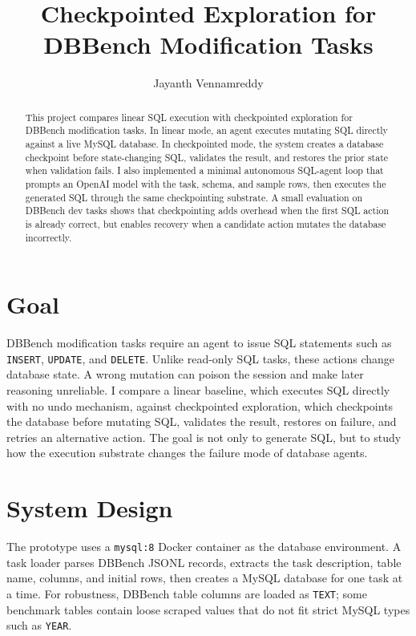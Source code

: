\documentclass[10pt,twocolumn]{article}
\title{Checkpointed Exploration for DBBench Modification Tasks}
\author{Jayanth Vennamreddy}
\date{}
\begin{document}
\maketitle

\begin{abstract}
This project compares linear SQL execution with checkpointed exploration for DBBench modification tasks. In linear mode, an agent executes mutating SQL directly against a live MySQL database. In checkpointed mode, the system creates a database checkpoint before state-changing SQL, validates the result, and restores the prior state when validation fails. I also implemented a minimal autonomous SQL-agent loop that prompts an OpenAI model with the task, schema, and sample rows, then executes the generated SQL through the same checkpointing substrate. A small evaluation on DBBench dev tasks shows that checkpointing adds overhead when the first SQL action is already correct, but enables recovery when a candidate action mutates the database incorrectly.
\end{abstract}

\section{Goal}

DBBench modification tasks require an agent to issue SQL statements such as \texttt{INSERT}, \texttt{UPDATE}, and \texttt{DELETE}. Unlike read-only SQL tasks, these actions change database state. A wrong mutation can poison the session and make later reasoning unreliable. I compare a linear baseline, which executes SQL directly with no undo mechanism, against checkpointed exploration, which checkpoints the database before mutating SQL, validates the result, restores on failure, and retries an alternative action. The goal is not only to generate SQL, but to study how the execution substrate changes the failure mode of database agents.

\section{System Design}

The prototype uses a \texttt{mysql:8} Docker container as the database environment. A task loader parses DBBench JSONL records, extracts the task description, table name, columns, and initial rows, then creates a MySQL database for one task at a time. For robustness, DBBench table columns are loaded as \texttt{TEXT}; some benchmark tables contain loose scraped values that do not fit strict MySQL types such as \texttt{YEAR}.
\end{document}
